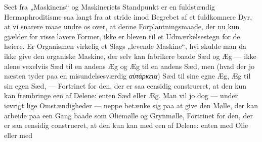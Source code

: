\documentclass[11pt]{book}
\newcommand{\opage}[1]{\marginnote{\footnotesize\textit{[#1]}}}
\begin{document}
Seet fra „Maskinens“ og Maskineriets Standpunkt er en fuldstændig
Hermaphroditisme saa langt fra at stride imod Begrebet af et
fuldkomnere Dyr, at vi snarere maae undre os over, at denne
Forplantningsmaade, der nu kun gjælder for visse lavere Former, ikke
er bleven til et Udmærkelsestegn for de høiere. Er Organismen
virkelig et Slags „levende Maskine“, hvi skulde man da ikke give den
organiske Maskine, der selv kan fabrikere baade Sæd og Æg --- ikke
alene vexelviis Sæd til en andens Æg og Æg
\opage{358} \setcounter{footnote}{0}%
til en andens Sæd, men (hvad der jo næsten tyder paa en
misundelsesværdig \textit{αὐτάρκεια}) Sæd til sine egne Æg, Æg til sin
egen Sæd, --- Fortrinet for den, der er saa eensidig construeret, at
den kun kan frembringe een af Delene: enten Sæd eller Æg. Man vil jo
dog --- under iøvrigt lige Omstændigheder --- neppe betænke sig paa at
give den Mølle, der kan arbeide paa een Gang baade som Oliemølle og
Grynmølle, Fortrinet for den, der er saa eensidig construeret, at den
kun kan med een af Delene: enten med Olie eller med
\end{document}

